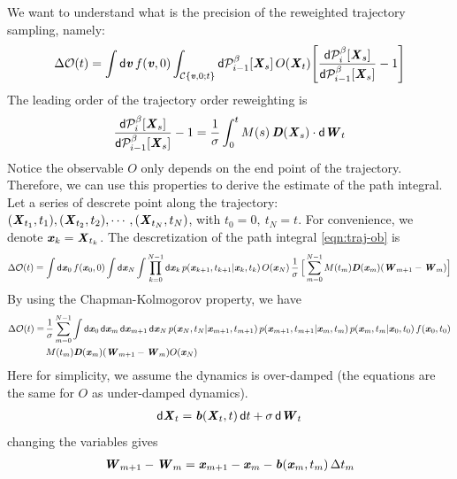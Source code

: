 \documentclass[aip,jcp,a4paper,reprint,onecolumn]{revtex4-1}
\newcommand{\vect}[1]{\textbf{\textit{#1}}}
\newcommand{\dd}{\textsf{d}}
\newcommand{\mo}{\mathcal O}
\newcommand{\mc}{\mathcal C}
\begin{document}
We want to understand what is the precision of the
reweighted trajectory sampling, namely:
\begin{align}\label{eqn:traj-ob}
  \Delta \mo (t) =
  \int \dd \vect v\, f(\vect v, 0)
  \int_{\mc\{\vect v, 0; t\}}
  \dd \mathcal P_{i-1}^\beta[\vect X_s]\,
  O(\vect X_t)
  \Bigg[
  \frac{\dd \mathcal P^\beta_i[\vect X_s]}
  {\dd \mathcal P^\beta_{i-1}[\vect X_s]}
  -1
  \Bigg]
\end{align}
The leading order of the trajectory order reweighting is
\begin{align}\label{eqn:leading-rew}
  \frac{\dd \mathcal P^\beta_i[\vect X_s]}
  {\dd \mathcal P^\beta_{i-1}[\vect X_s]}
  -1
  =
  \frac1\sigma\int_0^t M(s)\,
  \vect D(\vect X_s)\cdot \dd\vect W_t
\end{align}
Notice the observable $O$ only depends on the end point
of the trajectory. Therefore, we can use this properties to derive the
estimate of the path integral.
Let a series of descrete point along the trajectory:
$(\vect X_{t_1}, t_1), (\vect X_{t_2}, t_2), \cdots, (\vect X_{t_N}, t_N)$,
with $t_0 = 0,\ t_N = t$. For convenience, we denote
$\vect x_k = \vect X_{t_k}$. The descretization of the path integral
\eqref{eqn:traj-ob} is 
\begin{align}
  \Delta\mo (t) =
  \int\dd \vect x_0\, f(\vect x_0, 0)
  \int \dd \vect x_N
  \int
  \prod_{k=0}^{N-1}
  \dd \vect x_k\,
  p(\vect x_{k+1},t_{k+1} | \vect x_{k},t_{k})\,
  O(\vect x_N)\,
  \frac1\sigma\,
  \Big[
  \sum_{m=0}^{N-1}
  M(t_m) \vect D(\vect x_m) (\vect W_{m+1} - \vect W_{m})
  \Big]
\end{align}
By using the Chapman-Kolmogorov property, we have
\begin{align}\nonumber
  \Delta\mo (t) = &\,
  \frac1\sigma
  \sum_{m=0}^{N-1}
  \int \dd \vect x_0\,
  \dd \vect x_m\,
  \dd \vect x_{m+1}\,
  \dd \vect x_N\,
  p(\vect x_N,t_N | \vect x_{m+1}, t_{m+1})\,
  p(\vect x_{m+1}, t_{m+1} | \vect x_{m}, t_{m})\,
  p(\vect x_{m}, t_{m} | \vect x_{0}, t_{0}) \,
  f(\vect x_0, t_0)\\
  &\,
  M(t_m) \vect D(\vect x_m) (\vect W_{m+1} - \vect W_{m})  
  O(\vect x_N)
\end{align}
Here for simplicity, we assume the dynamics is over-damped (the equations
are the same for $O$ as under-damped dynamics).
\begin{align}
  \dd \vect X_t =
  \vect b(\vect X_t, t)\,\dd t +
  \sigma\, \dd \vect W_t
\end{align}
changing the variables gives
\begin{align}
  \vect W_{m+1} - \vect W_{m}
  =
  \vect x_{m+1} - \vect x_{m}
  -
  \vect b(\vect x_m, t_m)\,\Delta t_m
\end{align}
\end{document}
